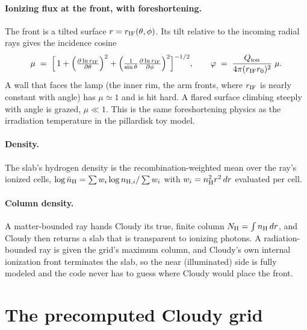 \documentclass[11pt]{article}
\newcommand{\nH}{n_{\rm H}}
\newcommand{\rIF}{r_{\rm IF}}
\begin{document}
\paragraph{Ionizing flux at the front, with foreshortening.}
The front is a tilted surface $r = \rIF(\theta,\phi)$. Its tilt
relative to the incoming radial rays gives the incidence cosine
\begin{equation}
\mu \;=\;
\Bigl[\,1 + \Bigl(\tfrac{\partial \ln \rIF}{\partial\theta}\Bigr)^{2}
        + \Bigl(\tfrac{1}{\sin\theta}
          \tfrac{\partial \ln \rIF}{\partial\phi}\Bigr)^{2}\Bigr]^{-1/2},
\qquad
\varphi \;=\; \frac{Q_{\rm ion}}{4\pi (\rIF r_0)^{2}}\;\mu .
\end{equation}
A wall that faces the lamp (the inner rim, the arm fronts, where
$\rIF$ is nearly constant with angle) has $\mu \simeq 1$ and is hit
hard. A flared surface climbing steeply with angle is grazed,
$\mu \ll 1$. This is the same foreshortening physics as the
irradiation temperature in the pillardisk toy model.

\paragraph{Density.} The slab's hydrogen density is the
recombination-weighted mean over the ray's ionized cells,
$\log \bar{n}_{\rm H} = \sum w_i \log n_{{\rm H},i} / \sum w_i$ with
$w_i = \nH^2 r^2\,dr$ evaluated per cell.

\paragraph{Column density.} A matter-bounded ray hands Cloudy its
true, finite column $N_{\rm H} = \int \nH\,dr$, and Cloudy then
returns a slab that is transparent to ionizing photons. A
radiation-bounded ray is given the grid's maximum column, and Cloudy's
own internal ionization front terminates the slab, so the near
(illuminated) side is fully modeled and the code never has to guess
where Cloudy would place the front.

\section{The precomputed Cloudy grid}
\end{document}
